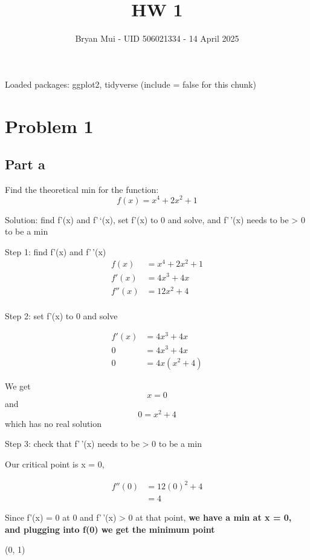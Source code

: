 \documentclass[
  letterpaper,
  DIV=11,
  numbers=noendperiod]{scrartcl}
\title{HW 1}
\author{Bryan Mui - UID 506021334 - 14 April 2025}
\date{}
\begin{document}
\maketitle


Loaded packages: ggplot2, tidyverse (include = false for this chunk)

\section{Problem 1}\label{problem-1}

\subsection{Part a}\label{part-a}

Find the theoretical min for the function: \[
f(x) = x^4 + 2x^2 + 1
\]

Solution: find f'(x) and f'\,`(x), set f'(x) to 0 and solve, and
f'\,'(x) needs to be \textgreater{} 0 to be a min

Step 1: find f'(x) and f'\,'(x) \begin{align}
  f(x) &= x^4 + 2x^2 + 1 \\ 
 f'(x) &= 4x^3 + 4x  \\
f''(x) &= 12x^2 + 4 \\
\end {align}

Step 2: set f'(x) to 0 and solve

\begin{align}
f'(x) &= 4x^3 + 4x  \\
    0 &= 4x^3 + 4x \\
    0 &= 4x(x^2 + 4)
\end{align}

We get \[x = 0\] and \[0 = x^2 +4\] which has no real solution

Step 3: check that f'\,'(x) needs to be \textgreater{} 0 to be a min

Our critical point is x = 0,

\begin{align}
f''(0)  &= 12(0)^2 + 4 \\
        &= 4
\end{align}

Since f'(x) = 0 at 0 and f'\,'(x) \textgreater{} 0 at that point,
\textbf{we have a min at x = 0, and plugging into f(0) we get the
minimum point}

\begin{center} (0, 1) \end{center}
\end{document}
